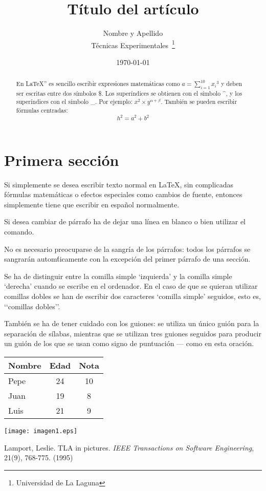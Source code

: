 \documentclass[a4paper,12pt]{article}
\begin{document}
 
\title{Título del artículo}
\author{Nombre y Apellido \\ 
        T\'ecnicas Experimentales~\footnote{Universidad de La Laguna}
        }
\date{\today}
\maketitle
\begin{abstract}
 En \LaTeX{}''\cite{Lam:86} es sencillo escribir expresiones
 matem\'aticas como $a=\sum_{i=1}^{10} {x_i}^{3}$
 y deben ser escritas entre dos s\'imbolos \$.
 Los superíndices se obtienen con el s\'imbolo \^{}, y
 los super\'indices con el s\'imbolo \_.
 Por ejemplo: $x^2 \times y ^{\alpha + \beta}$.
 Tambi\'en se pueden escribir f\'ormulas centradas:
 \[h^2=a^2 + b^2 \]
\end{abstract}

\section{Primera sección}
Si simplemente se desea escribir texto normal en LaTeX,
sin complicadas f\'ormulas matem\'aticas o efectos especiales
como cambios de fuente, entonces simplemente tiene que escribir
en espa\~nol normalmente.

Si desea cambiar de p\'arrafo ha de dejar una l\'inea en blanco o bien
utilizar el comando.\par

No es necesario preocuparse de la sangr\'ia de los p\'arrafos:
todos los p\'arrafos se sangrarán autom\'ticamente con la excepci\'on
del primer párrafo de una secci\'on.

Se ha de distinguir entre la comilla simple ‘izquierda’
y la comilla simple ‘derecha’ cuando se escribe en el ordenador.
En el caso de que se quieran utilizar comillas dobles se han de
escribir dos caracteres ‘comilla simple’ seguidos, esto es,
‘‘comillas dobles’’.\par

Tambi\'en se ha de tener cuidado con los guiones: se utiliza un \'unico
gui\'on para la separación de s\'ilabas, mientras que se utilizan
tres guiones seguidos para producir un guión de los que se usan
como signo de puntuaci\'on --- como en esta oración.

\bigskip
\begin{tabular}{|l|c|c|}
\hline
 Nombre & Edad & Nota \\ \hline
 Pepe   &   24 &   10 \\ \hline
 Juan   &   19 &    8 \\ \hline
 Luis   &   21 &    9   \\ \hline
\end{tabular}
\texttt{[image: imagen1.eps]}
\begin{thebibliography}{00}
 Lamport, Leslie.
 TLA in pictures.
 \emph{IEEE Transactions on Software Engineering},
 21(9), 768-775.
 (1995)
\end{thebibliography}
\end{document}
